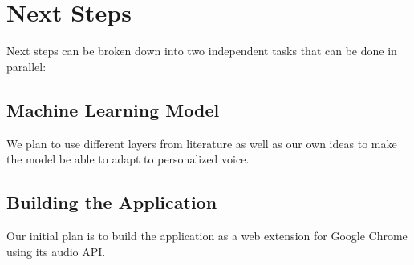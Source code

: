 \section{Next Steps}
Next steps can be broken down into two independent tasks that can be done in parallel:

\subsection{Machine Learning Model}
We plan to use different layers from literature as well as our own ideas to make the model be able to adapt to personalized voice.


\subsection{Building the Application}
Our initial plan is to build the application as a web extension for Google Chrome using its audio API.
